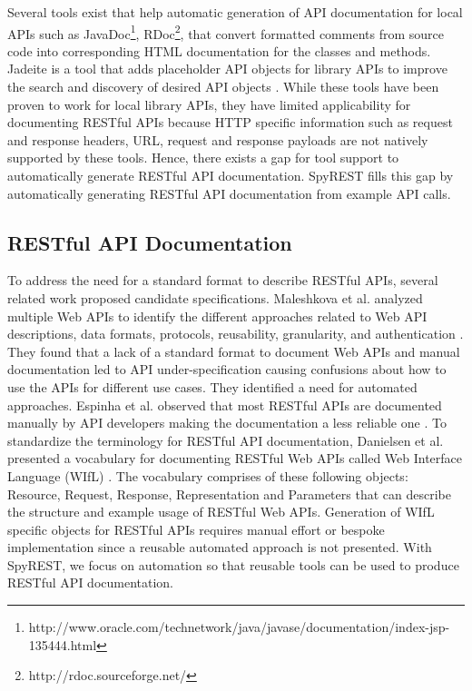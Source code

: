 \documentclass[conference]{IEEEtran}
\begin{document}
Several tools exist that help automatic generation of API documentation for local APIs such as JavaDoc\footnote{http://www.oracle.com/technetwork/java/javase/documentation/index-jsp-135444.html}, RDoc\footnote{http://rdoc.sourceforge.net/}, that convert formatted comments from source code into corresponding HTML documentation for the classes and methods. Jadeite is a tool that adds placeholder API objects for library APIs to improve the search and discovery of desired API objects \cite{Jadeite}. While these tools have been proven to work for local library APIs, they have limited applicability for documenting RESTful APIs because HTTP specific information such as request and response headers, URL, request and response payloads are not natively supported by these tools. Hence, there exists a gap for tool support to automatically generate RESTful API documentation. SpyREST fills this gap by automatically generating RESTful API documentation from example API calls.

\subsection{RESTful API Documentation} %
\label{sub:restful_api_documentation}

To address the need for a standard format to describe RESTful APIs, several related work proposed candidate specifications. Maleshkova et al. analyzed multiple Web APIs to identify the different approaches related to Web API descriptions, data formats, protocols, reusability, granularity, and authentication \cite{Maleshkova_investigating}. They found that a lack of a standard format to document Web APIs and manual documentation led to API under-specification causing confusions about how to use the APIs for different use cases. They identified a need for automated approaches. Espinha et al. observed that most RESTful APIs are documented manually by API developers making the documentation a less reliable one \cite{Espinha_web}. To standardize the terminology for RESTful API documentation, Danielsen et al. presented a vocabulary for documenting RESTful Web APIs called Web Interface Language (WIfL) \cite{Danielsen_validation}. The vocabulary comprises of these following objects: Resource, Request, Response, Representation and Parameters that can describe the structure and example usage of RESTful Web APIs. Generation of WIfL specific objects for RESTful APIs requires manual effort or bespoke implementation since a reusable automated approach is not presented. With SpyREST, we focus on automation so that reusable tools can be used to produce RESTful API documentation.
\end{document}
